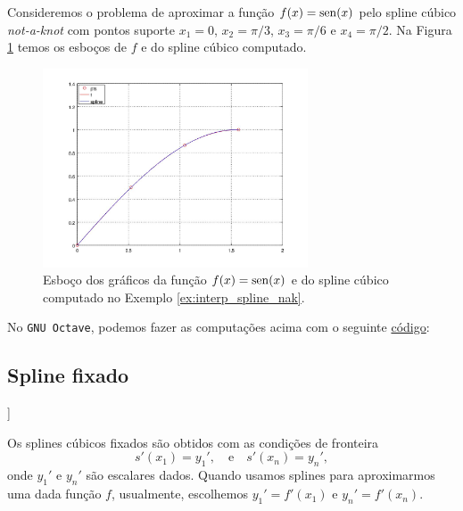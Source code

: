 \begin{ex}\label{ex:interp_spline_nak}
  Consideremos o problema de aproximar a função $f(x)=\operatorname{sen}(x)$ pelo spline cúbico {\it not-a-knot} com pontos suporte $x_1=0$, $x_2=\pi/3$, $x_3=\pi/6$ e $x_4=\pi/2$. Na Figura \ref{fig:interp_spline_nak} temos os esboços de $f$ e do spline cúbico computado.

  \begin{figure}[h!]
    \centering
    \includegraphics[width=0.7\textwidth]{./cap_interp/dados/ex_interp_spline_nak/fig_interp_spline_nak}
    \caption{Esboço dos gráficos da função $f(x)=\operatorname{sen}(x)$ e do spline cúbico computado no Exemplo \ref{ex:interp_spline_nak}.}
    \label{fig:interp_spline_nak}
  \end{figure}

\ifisoctave
No \verb+GNU Octave+, podemos fazer as computações acima com o seguinte \href{https://github.com/phkonzen/notas/blob/master/src/MatematicaNumerica/cap_interp/dados/ex_interp_spline_nak/ex_interp_spline_nak.m}{código}:

\fi
\end{ex}

\subsection{Spline fixado}

\begin{flushleft}
  [[tag:revisar]]
\end{flushleft}

Os splines cúbicos fixados são obtidos com as condições de fronteira
\begin{equation}
  s'(x_1)=y_1',\quad\text{e}\quad s'(x_n)=y_n',
\end{equation}
onde $y_1'$ e $y_n'$ são escalares dados. Quando usamos splines para aproximarmos uma dada função $f$, usualmente, escolhemos $y_1'=f'(x_1)$ e $y_n'=f'(x_n)$.

